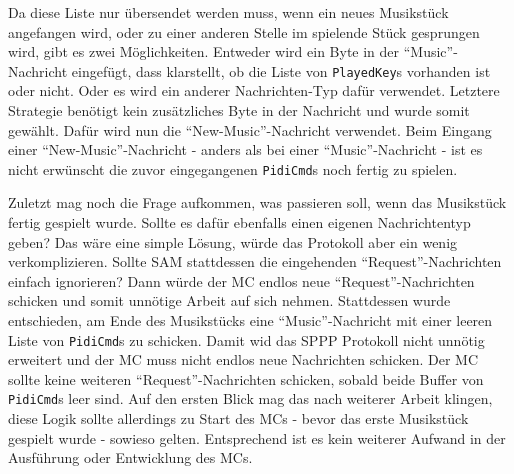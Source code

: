 Da diese Liste nur übersendet werden muss, wenn ein neues Musikstück angefangen wird, oder zu einer anderen Stelle im spielende Stück gesprungen wird, gibt es zwei Möglichkeiten.
Entweder wird ein Byte in der \enquote{Music}-Nachricht eingefügt, dass klarstellt, ob die Liste von \lstinline|PlayedKey|s vorhanden ist oder nicht.
Oder es wird ein anderer Nachrichten-Typ dafür verwendet.
Letztere Strategie benötigt kein zusätzliches Byte in der Nachricht und wurde somit gewählt.
Dafür wird nun die \enquote{New-Music}-Nachricht verwendet.
Beim Eingang einer \enquote{New-Music}-Nachricht - anders als bei einer \enquote{Music}-Nachricht - ist es nicht erwünscht die zuvor eingegangenen \lstinline|PidiCmd|s noch fertig zu spielen.

Zuletzt mag noch die Frage aufkommen, was passieren soll, wenn das Musikstück fertig gespielt wurde.
Sollte es dafür ebenfalls einen eigenen Nachrichtentyp geben?
Das wäre eine simple Lösung, würde das Protokoll aber ein wenig verkomplizieren.
Sollte \ac{SAM} stattdessen die eingehenden \enquote{Request}-Nachrichten einfach ignorieren?
Dann würde der \ac{MC} endlos neue \enquote{Request}-Nachrichten schicken und somit unnötige Arbeit auf sich nehmen.
Stattdessen wurde entschieden, am Ende des Musikstücks eine \enquote{Music}-Nachricht mit einer leeren Liste von \lstinline|PidiCmd|s zu schicken.
Damit wid das \ac{SPPP} Protokoll nicht unnötig erweitert und der \ac{MC} muss nicht endlos neue Nachrichten schicken.
Der \ac{MC} sollte keine weiteren \enquote{Request}-Nachrichten schicken, sobald beide Buffer von \lstinline|PidiCmd|s leer sind.
Auf den ersten Blick mag das nach weiterer Arbeit klingen, diese Logik sollte allerdings zu Start des \ac{MC}s - bevor das erste Musikstück gespielt wurde - sowieso gelten.
Entsprechend ist es kein weiterer Aufwand in der Ausführung oder Entwicklung des \ac{MC}s.

